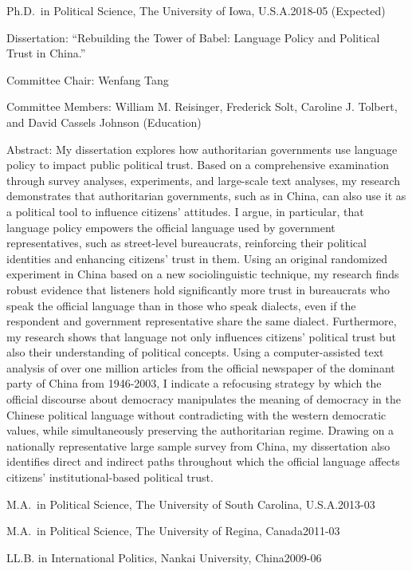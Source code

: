 \documentclass[10.5pt,]{article}
\providecommand{\tightlist}{%
	\setlength{\itemsep}{0pt}\setlength{\parskip}{0pt}}
\renewenvironment{itemize}{
	\begin{list}{}{
			\setlength{\leftmargin}{1.5em}
		}
	}{
	\end{list}
}
\begin{document}
\begin{itemize}
\tightlist
\item
  Ph.D.~in Political Science, The University of Iowa,
  U.S.A.\hfill 2018-05 (Expected)

  \begin{itemize}
  \tightlist
  \item
    \footnotesize Dissertation: ``Rebuilding the Tower of Babel:
    Language Policy and Political Trust in China.''

    \begin{itemize}
    \tightlist
    \item
      Committee Chair: Wenfang Tang
    \item
      Committee Members: William M. Reisinger, Frederick Solt, Caroline
      J. Tolbert, and David Cassels Johnson (Education)
    \item
      Abstract: My dissertation explores how authoritarian governments
      use language policy to impact public political trust. Based on a
      comprehensive examination through survey analyses, experiments,
      and large-scale text analyses, my research demonstrates that
      authoritarian governments, such as in China, can also use it as a
      political tool to influence citizens' attitudes. I argue, in
      particular, that language policy empowers the official language
      used by government representatives, such as street-level
      bureaucrats, reinforcing their political identities and enhancing
      citizens' trust in them. Using an original randomized experiment
      in China based on a new sociolinguistic technique, my research
      finds robust evidence that listeners hold significantly more trust
      in bureaucrats who speak the official language than in those who
      speak dialects, even if the respondent and government
      representative share the same dialect. Furthermore, my research
      shows that language not only influences citizens' political trust
      but also their understanding of political concepts. Using a
      computer-assisted text analysis of over one million articles from
      the official newspaper of the dominant party of China from
      1946-2003, I indicate a refocusing strategy by which the official
      discourse about democracy manipulates the meaning of democracy in
      the Chinese political language without contradicting with the
      western democratic values, while simultaneously preserving the
      authoritarian regime. Drawing on a nationally representative large
      sample survey from China, my dissertation also identifies direct
      and indirect paths throughout which the official language affects
      citizens' institutional-based political trust.
    \end{itemize}
  \end{itemize}
\item
  M.A.~in Political Science, The University of South Carolina,
  U.S.A.\hfill 2013-03
\item
  M.A.~in Political Science, The University of Regina,
  Canada\hfill 2011-03
\item
  LL.B. in International Politics, Nankai University,
  China\hfill 2009-06
\end{itemize}
\end{document}
